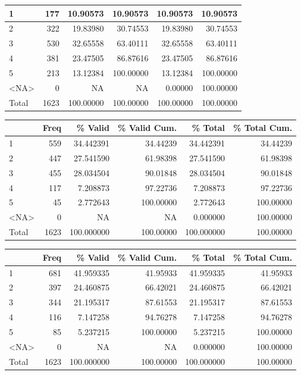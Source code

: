 \documentclass[
  letterpaper,
  DIV=11,
  numbers=noendperiod]{scrartcl}
\begin{document}
\begin{table}
\begin{tabular}[t]{l|r|r|r|r|r}
\hline
1 & 177 & 10.90573 & 10.90573 & 10.90573 & 10.90573\\
\hline
2 & 322 & 19.83980 & 30.74553 & 19.83980 & 30.74553\\
\hline
3 & 530 & 32.65558 & 63.40111 & 32.65558 & 63.40111\\
\hline
4 & 381 & 23.47505 & 86.87616 & 23.47505 & 86.87616\\
\hline
5 & 213 & 13.12384 & 100.00000 & 13.12384 & 100.00000\\
\hline
<NA> & 0 & NA & NA & 0.00000 & 100.00000\\
\hline
Total & 1623 & 100.00000 & 100.00000 & 100.00000 & 100.00000\\
\hline
\end{tabular}
\centering
\begin{tabular}[t]{l|r|r|r|r|r}
\hline
  & Freq & \% Valid & \% Valid Cum. & \% Total & \% Total Cum.\\
\hline
1 & 559 & 34.442391 & 34.44239 & 34.442391 & 34.44239\\
\hline
2 & 447 & 27.541590 & 61.98398 & 27.541590 & 61.98398\\
\hline
3 & 455 & 28.034504 & 90.01848 & 28.034504 & 90.01848\\
\hline
4 & 117 & 7.208873 & 97.22736 & 7.208873 & 97.22736\\
\hline
5 & 45 & 2.772643 & 100.00000 & 2.772643 & 100.00000\\
\hline
<NA> & 0 & NA & NA & 0.000000 & 100.00000\\
\hline
Total & 1623 & 100.000000 & 100.00000 & 100.000000 & 100.00000\\
\hline
\end{tabular}
\centering
\begin{tabular}[t]{l|r|r|r|r|r}
\hline
  & Freq & \% Valid & \% Valid Cum. & \% Total & \% Total Cum.\\
\hline
1 & 681 & 41.959335 & 41.95933 & 41.959335 & 41.95933\\
\hline
2 & 397 & 24.460875 & 66.42021 & 24.460875 & 66.42021\\
\hline
3 & 344 & 21.195317 & 87.61553 & 21.195317 & 87.61553\\
\hline
4 & 116 & 7.147258 & 94.76278 & 7.147258 & 94.76278\\
\hline
5 & 85 & 5.237215 & 100.00000 & 5.237215 & 100.00000\\
\hline
<NA> & 0 & NA & NA & 0.000000 & 100.00000\\
\hline
Total & 1623 & 100.000000 & 100.00000 & 100.000000 & 100.00000\\

\end{tabular}
\end{table}
\end{document}
